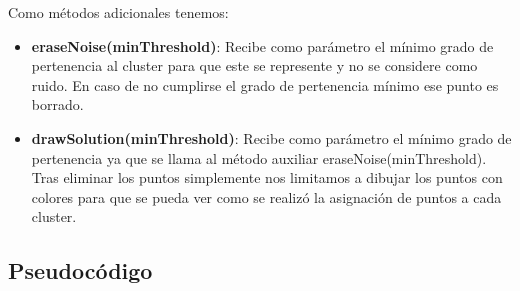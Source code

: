 \documentclass[conference,a4paper]{IEEEtran}
\begin{document}
Como métodos adicionales tenemos:

\begin{itemize}

	\item{\textbf{eraseNoise(minThreshold)}: Recibe como parámetro el mínimo grado de pertenencia al cluster para que este se represente y no se considere como ruido. En caso de no cumplirse el grado de pertenencia mínimo ese punto es borrado.}

	\item{\textbf{drawSolution(minThreshold)}: Recibe como parámetro el mínimo grado de pertenencia ya que se llama al método auxiliar eraseNoise(minThreshold). Tras eliminar los puntos simplemente nos limitamos a dibujar los puntos con colores para que se pueda ver como se realizó la asignación de puntos a cada cluster.}

\end{itemize}
\newpage

\subsection{Pseudocódigo}
\end{document}
